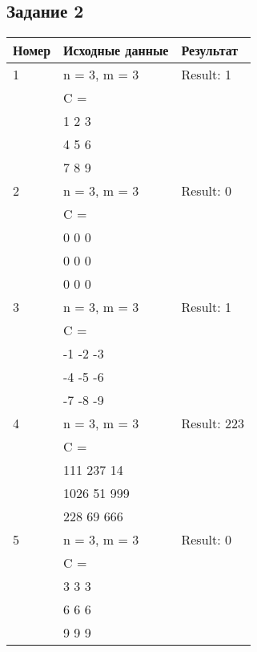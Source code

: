 \begin{minipage}[t]{0.5\textwidth}
\subsection*{\centering Задание 2}
\begin{tabular}{|l|l|l|}
  \hline
  Номер & Исходные данные & Результат\\[2ex]
  \hline  
  1 & n = 3, m = 3        & Result: 1\\
    & C =                 & \\
    & 1 2 3               & \\
    & 4 5 6               & \\
    & 7 8 9               & \\
  \hline
  2 & n = 3, m = 3        & Result: 0 \\
    & C =                 & \\
    & 0 0 0               & \\
    & 0 0 0               & \\
    & 0 0 0               & \\
  \hline
  3 & n = 3, m = 3        & Result: 1 \\
    & C =                 & \\
    & -1 -2 -3            & \\
    & -4 -5 -6            & \\
    & -7 -8 -9            & \\
  \hline
  4 & n = 3, m = 3        & Result: 223 \\
    & C =                 & \\
    & 111  237 14         & \\
    & 1026 51  999        & \\
    & 228  69  666        & \\
  \hline
  5 & n = 3, m = 3        & Result: 0\\
    & C =                 & \\
    & 3 3 3               & \\
    & 6 6 6               & \\
    & 9 9 9               & \\
  \hline
\end{tabular}
\end{minipage}